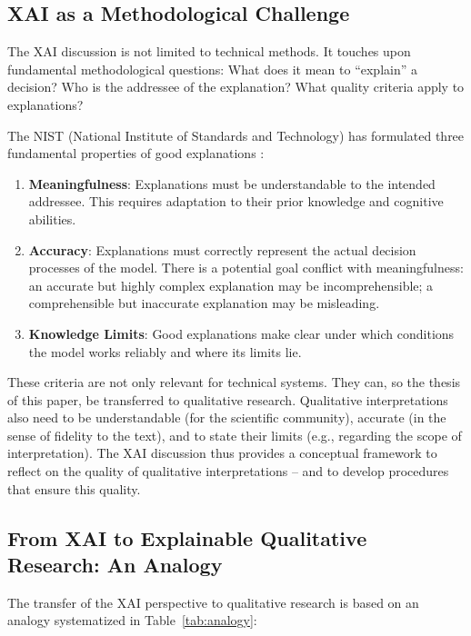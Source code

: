 \documentclass[
  12pt,
  a4paper,
  oneside,
  titlepage
]{article}
\begin{document}
\subsection{XAI as a Methodological Challenge}

The XAI discussion is not limited to technical methods. It touches upon 
fundamental methodological questions: What does it mean to \enquote{explain} 
a decision? Who is the addressee of the explanation? What quality 
criteria apply to explanations?

The NIST (National Institute of Standards and Technology) has formulated 
three fundamental properties of good explanations \citep[ p.~80810]{Ortigossa2024}:

\begin{enumerate}
    \item \textbf{Meaningfulness}: Explanations must be understandable 
    to the intended addressee. This requires adaptation to their prior 
    knowledge and cognitive abilities.
    
    \item \textbf{Accuracy}: Explanations must correctly represent the 
    actual decision processes of the model. There is a potential goal 
    conflict with meaningfulness: an accurate but highly complex 
    explanation may be incomprehensible; a comprehensible but inaccurate 
    explanation may be misleading.
    
    \item \textbf{Knowledge Limits}: Good explanations make clear under 
    which conditions the model works reliably and where its limits lie.
\end{enumerate}

These criteria are not only relevant for technical systems. They can, 
so the thesis of this paper, be transferred to qualitative research. 
Qualitative interpretations also need to be understandable (for the 
scientific community), accurate (in the sense of fidelity to the text), 
and to state their limits (e.g., regarding the scope of interpretation). 
The XAI discussion thus provides a conceptual framework to reflect on 
the quality of qualitative interpretations – and to develop procedures 
that ensure this quality.

\subsection{From XAI to Explainable Qualitative Research: An Analogy}

The transfer of the XAI perspective to qualitative research is based on 
an analogy systematized in Table~\ref{tab:analogy}:
\end{document}
